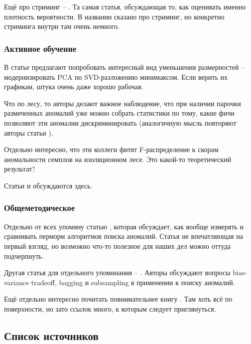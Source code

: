 \documentclass[12pt]{article}
\begin{document}
Ещё про стриминг --
\cite{wuRSForestRapidDensity2014}
. Та самая статья, обсуждающая то, как оценивать именно плотность вероятности.
В названии сказано про стриминг, но конкретно стриминга внутри там очень немного.


\subsubsection*{Активное обучение}

В статье
\cite{pugginiEnhancedVariableSelection2018}
предлагают попробовать интересный вид
уменьшения размерностей -- модернизировать PCA по SVD-разложению минимаксом.
Если верить их графикам, штука очень даже хорошо рабочая.

Что по лесу, то 
авторы делают важное наблюдение, что при наличии парочки размеченных аномалий уже
можно собрать статистики по тому, какие фичи позволяют эти аномалии дискриминировать
(аналогичную мысль повторяют авторы статьи
\cite{gavaiDetectingInsiderThreat2015}
).

Отдельно интересно, что эти коллеги фитят F-распределение к скорам аномальности
семплов на изоляционном лесе. Это какой-то теоретический результат?

Статьи
\cite{siddiquiFeedbackGuidedAnomalyDiscovery2018}
и
\cite{dasIncorporatingExpertFeedback}
обсуждаются здесь.


\subsubsection*{Общеметодическое}

Отдельно от всех упомяну статью
\cite{camposEvaluationUnsupervisedOutlier2016}
, которая обсуждает, как вообще измерять и сравнивать перморм алгоритмов поиска
аномалий. Статья не впечатляющая на первый взгляд, но возможно что-то полезное
для наших дел можно оттуда подчерпнуть.

Другая статья для отдельного упоминания --
\cite{aggarwalTheoreticalFoundationsAlgorithms2015}
. Авторы обсуждают вопросы bias-variance tradeoff, bagging и subsampling в применении
к поиску аномалий.

Ещё отдельно интересно почитать повнимательнее книгу
\cite{aggarwalOutlierEnsembles2017}
. Там хоть всё по поверхности, но зато ссылок много, к которым следует приглянуться.


\subsection*{Список источников}
\printbibliography[heading=none]
\end{document}
